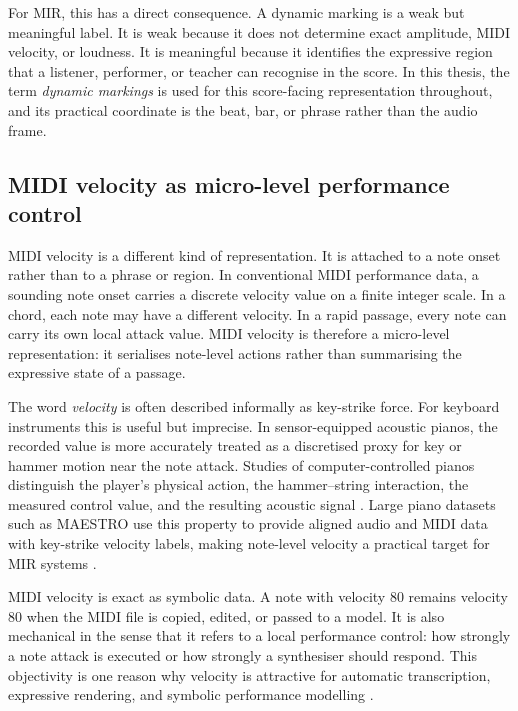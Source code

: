 For MIR, this has a direct consequence. A dynamic marking is a weak but meaningful label. It is weak because it does not determine exact amplitude, MIDI velocity, or loudness. It is meaningful because it identifies the expressive region that a listener, performer, or teacher can recognise in the score. In this thesis, the term \emph{dynamic markings} is used for this score-facing representation throughout, and its practical coordinate is the beat, bar, or phrase rather than the audio frame.

\subsection{MIDI velocity as micro-level performance control}
\label{sec:bg:midi_velocity}

MIDI velocity is a different kind of representation. It is attached to a note onset rather than to a phrase or region. In conventional MIDI performance data, a sounding note onset carries a discrete velocity value on a finite integer scale. In a chord, each note may have a different velocity. In a rapid passage, every note can carry its own local attack value. MIDI velocity is therefore a micro-level representation: it serialises note-level actions rather than summarising the expressive state of a passage.

The word \emph{velocity} is often described informally as key-strike force. For keyboard instruments this is useful but imprecise. In sensor-equipped acoustic pianos, the recorded value is more accurately treated as a discretised proxy for key or hammer motion near the note attack. Studies of computer-controlled pianos distinguish the player's physical action, the hammer--string interaction, the measured control value, and the resulting acoustic signal \cite{goebl2003role,goebl2004piano}. Large piano datasets such as MAESTRO use this property to provide aligned audio and MIDI data with key-strike velocity labels, making note-level velocity a practical target for MIR systems \cite{hawthorne2019maestro}.

MIDI velocity is exact as symbolic data. A note with velocity 80 remains velocity 80 when the MIDI file is copied, edited, or passed to a model. It is also mechanical in the sense that it refers to a local performance control: how strongly a note attack is executed or how strongly a synthesiser should respond. This objectivity is one reason why velocity is attractive for automatic transcription, expressive rendering, and symbolic performance modelling \cite{ewert2011est,kim2023score,kim2024method}.

